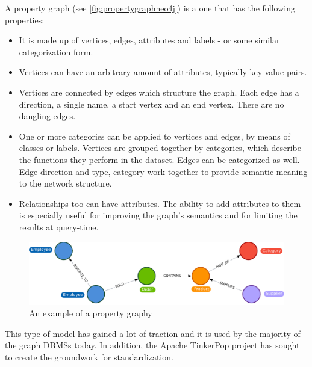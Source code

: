 \begin{definition}\label{definition:ofpropertygraphs}
	A property graph (see \hyperref[fig:propertygraphneo4j]{\autoref{fig:propertygraphneo4j}}) is a one that has the following properties:
	 \begin{itemize}[noitemsep]
		\item It is made up of vertices, edges, attributes and labels - or some similar categorization form.
		\item Vertices can have an arbitrary amount of attributes, typically key-value pairs.
		\item Vertices are connected by edges which structure the graph.
			  Each edge has a direction, a single name, a start vertex and an end vertex.
			  There are no dangling edges.
		\item One or more categories can be applied to vertices and edges, by means of classes or labels.
			  Vertices are grouped together by categories, which describe the functions they perform in the dataset.
			  Edges can be categorized as well.
			  Edge direction and type, category work together to provide semantic meaning to the network structure.
		\item Relationships too can have attributes.
			  The ability to add attributes to them is especially useful for improving the graph's semantics and for limiting the results at query-time.
    \end{itemize}
\end{definition}

\begin{figure}[H]%
	\centering%
	\includegraphics[width=1\textwidth]{images/chapter2/propertygraphneo4j.pdf}%
	\caption[An example of a property graphy]{An example of a property graphy}%
	\label{fig:propertygraphneo4j}%
\end{figure}%

This type of model has gained a lot of traction and it is used by the majority of the graph DBMSs today.
In addition, the Apache TinkerPop project has sought to create the groundwork for standardization.

